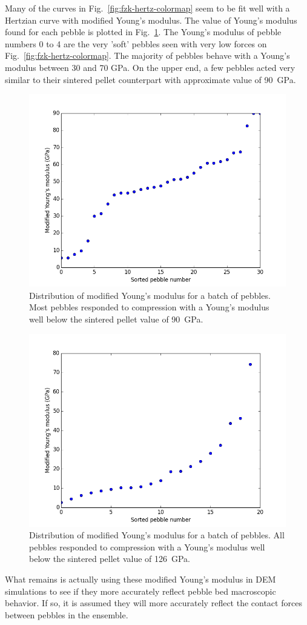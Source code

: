 Many of the curves in Fig.~\ref{fig:fzk-hertz-colormap} seem to be fit well with a Hertzian curve with modified Young's modulus. The value of Young's modulus found for each pebble is plotted in Fig.~\ref{fig:fzk-E-plot}. The Young's modulus of pebble numbers 0 to 4 are the very 'soft' pebbles seen with very low forces on Fig.~\ref{fig:fzk-hertz-colormap}. The majority of pebbles behave with a Young's modulus between 30 and 70 \si{GPa}. On the upper end, a few pebbles acted very similar to their sintered pellet counterpart with approximate value of \si{90 GPa}.

\begin{figure}[ht!]
\centering
\includegraphics[width = 0.75 \textwidth]{chapters/figures/fzk-E-plot}
\caption{Distribution of modified Young's modulus for a batch of \lis pebbles. Most pebbles responded to compression with a Young's modulus well below the sintered pellet value of \si{90 GPa}.}\label{fig:fzk-E-plot}
\end{figure}

\begin{figure}[ht!]
\centering
\includegraphics[width = 0.75 \textwidth]{chapters/figures/nfri-E-plot}
\caption{Distribution of modified Young's modulus for a batch of \lit pebbles. All pebbles responded to compression with a Young's modulus well below the sintered pellet value of \si{126 GPa}.}\label{fig:nfri-E-plot}
\end{figure}


What remains is actually using these modified Young's modulus in DEM simulations to see if they more accurately reflect pebble bed macroscopic behavior. If so, it is assumed they will more accurately reflect the contact forces between pebbles in the ensemble.



